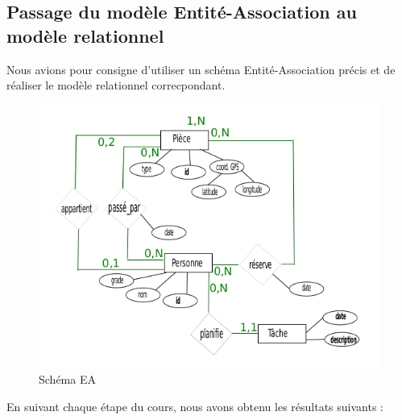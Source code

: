\subsection{Passage du modèle Entité-Association au modèle relationnel}
Nous avions pour consigne d'utiliser un schéma Entité-Association précis et de réaliser le modèle relationnel correcpondant.

\begin{figure}
	\begin{center}
	\includegraphics[width=500px]{./images/SchemaEA.png}
	\end{center}
\caption{Schéma EA}
\label{Schéma EA}
\end{figure}

En suivant chaque étape du cours, nous avons obtenu les résultats suivants :

